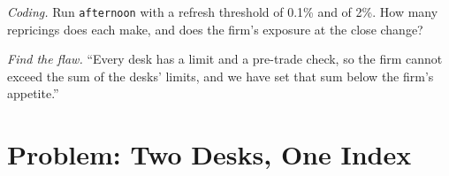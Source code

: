 \begin{exercise}[$\star\star\star$]\label{exo:pl:real-time-risk:7}
\emph{Coding.} Run \texttt{afternoon} with a refresh threshold of 0.1\% and of 2\%. How many repricings does each make, and does the firm's
exposure at the close change?
\end{exercise}

\begin{exercise}[$\star\star\star$]\label{exo:pl:real-time-risk:8}
\emph{Find the flaw.} ``Every desk has a limit and a pre-trade check, so the firm cannot exceed the sum of the desks' limits, and we have set
that sum below the firm's appetite.''
\end{exercise}

\section{Problem: Two Desks, One Index}

